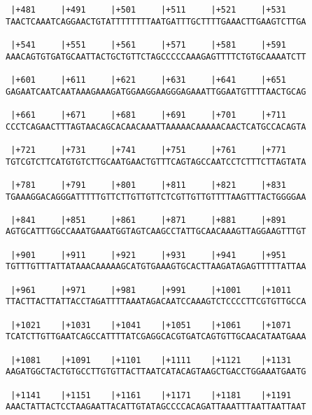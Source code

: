 \documentclass{article}
\begin{document}
\begin{Verbatim}
 |+481     |+491     |+501     |+511     |+521     |+531    
TAACTCAAATCAGGAACTGTATTTTTTTTAATGATTTGCTTTTGAAACTTGAAGTCTTGA
                                                            
 |+541     |+551     |+561     |+571     |+581     |+591    
AAACAGTGTGATGCAATTACTGCTGTTCTAGCCCCCAAAGAGTTTTCTGTGCAAAATCTT
                                                            
 |+601     |+611     |+621     |+631     |+641     |+651    
GAGAATCAATCAATAAAGAAAGATGGAAGGAAGGGAGAAATTGGAATGTTTTAACTGCAG
                                                            
 |+661     |+671     |+681     |+691     |+701     |+711    
CCCTCAGAACTTTAGTAACAGCACAACAAATTAAAAACAAAAACAACTCATGCCACAGTA
                                                            
 |+721     |+731     |+741     |+751     |+761     |+771    
TGTCGTCTTCATGTGTCTTGCAATGAACTGTTTCAGTAGCCAATCCTCTTTCTTAGTATA
                                                            
 |+781     |+791     |+801     |+811     |+821     |+831    
TGAAAGGACAGGGATTTTTGTTCTTGTTGTTCTCGTTGTTGTTTTAAGTTTACTGGGGAA
                                                            
 |+841     |+851     |+861     |+871     |+881     |+891    
AGTGCATTTGGCCAAATGAAATGGTAGTCAAGCCTATTGCAACAAAGTTAGGAAGTTTGT
                                                            
 |+901     |+911     |+921     |+931     |+941     |+951    
TGTTTGTTTATTATAAACAAAAAGCATGTGAAAGTGCACTTAAGATAGAGTTTTTATTAA
                                                            
 |+961     |+971     |+981     |+991     |+1001    |+1011   
TTACTTACTTATTACCTAGATTTTAAATAGACAATCCAAAGTCTCCCCTTCGTGTTGCCA
                                                            
 |+1021    |+1031    |+1041    |+1051    |+1061    |+1071   
TCATCTTGTTGAATCAGCCATTTTATCGAGGCACGTGATCAGTGTTGCAACATAATGAAA
                                                            
 |+1081    |+1091    |+1101    |+1111    |+1121    |+1131   
AAGATGGCTACTGTGCCTTGTGTTACTTAATCATACAGTAAGCTGACCTGGAAATGAATG
                                                            
 |+1141    |+1151    |+1161    |+1171    |+1181    |+1191   
AAACTATTACTCCTAAGAATTACATTGTATAGCCCCACAGATTAAATTTAATTAATTAAT
                                                            

\end{Verbatim}
\end{document}
